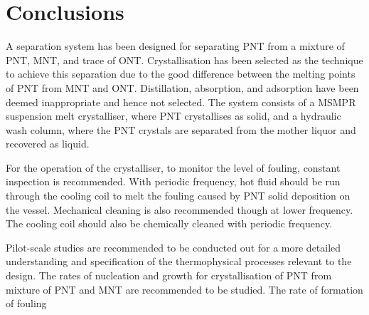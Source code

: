\section{Conclusions}\label{separation conclusions}

A separation system has been designed for separating PNT from a mixture of PNT, MNT, and trace of ONT. Crystallisation has been selected as the technique to achieve this separation due to the good difference between the melting points of PNT from MNT and ONT. Distillation, absorption, and adsorption have been deemed inappropriate and hence not selected. The system consists of a MSMPR suspension melt crystalliser, where PNT crystallises as solid, and a hydraulic wash column, where the PNT crystals are separated from the mother liquor and recovered as liquid. 

For the operation of the crystalliser, to monitor the level of fouling, constant inspection is recommended. With periodic frequency, hot fluid should be run through the cooling coil to melt the fouling caused by PNT solid deposition on the vessel. Mechanical cleaning is also recommended though at lower frequency. The cooling coil should also be chemically cleaned with periodic frequency. 

Pilot-scale studies are recommended to be conducted out for a more detailed understanding and specification of the thermophysical processes relevant to the design. The rates of nucleation and growth for crystallisation of PNT from mixture of PNT and MNT are recommended to be studied. The rate of formation of fouling 
